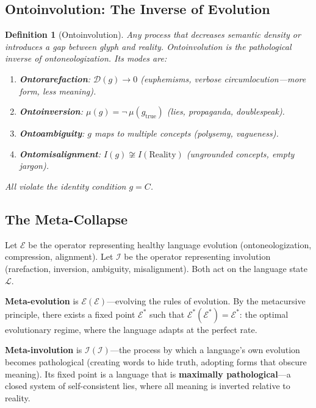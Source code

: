 \documentclass[12pt, letterpaper]{book}
\def\equiv{=}%
\def\mathfrak#1{#1}%
\newtheorem{definition}{Definition}[chapter]
\begin{document}
\subsection{Ontoinvolution: The Inverse of Evolution}

\begin{definition}[Ontoinvolution]\label{def:ontoinvolution}
Any process that \textit{decreases} semantic density or introduces a gap between glyph and reality. Ontoinvolution is the pathological inverse of ontoneologization. Its modes are:
\begin{enumerate}[label=(\roman*)]
    \item \textbf{Ontorarefaction}: $\mathcal{D}(\mathfrak{g}) \to 0$ (euphemisms, verbose circumlocution---more form, less meaning).
    \item \textbf{Ontoinversion}: $\mu(\mathfrak{g}) \equiv \neg\, \mu(\mathfrak{g}_{\mathrm{true}})$ (lies, propaganda, doublespeak).
    \item \textbf{Ontoambiguity}: $\mathfrak{g}$ maps to multiple concepts (polysemy, vagueness).
    \item \textbf{Ontomisalignment}: $I(\mathfrak{g}) \not\cong I(\mathrm{Reality})$ (ungrounded concepts, empty jargon).
\end{enumerate}
All violate the identity condition $\mathfrak{g} \equiv C$.
\end{definition}

\subsection{The Meta-Collapse}

Let $\mathcal{E}$ be the operator representing healthy language evolution (ontoneologization, compression, alignment). Let $\mathcal{I}$ be the operator representing involution (rarefaction, inversion, ambiguity, misalignment). Both act on the language state $\mathcal{L}$.

\textbf{Meta-evolution} is $\mathcal{E}(\mathcal{E})$---evolving the rules of evolution. By the metacursive principle, there exists a fixed point $\mathcal{E}^*$ such that $\mathcal{E}^*(\mathcal{E}^*) = \mathcal{E}^*$: the optimal evolutionary regime, where the language adapts at the perfect rate.

\textbf{Meta-involution} is $\mathcal{I}(\mathcal{I})$---the process by which a language's own evolution becomes pathological (creating words to hide truth, adopting forms that obscure meaning). Its fixed point is a language that is \textbf{maximally pathological}---a closed system of self-consistent lies, where all meaning is inverted relative to reality.
\end{document}

